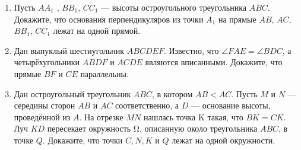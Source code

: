 \documentclass{article}
\begin{document}
\begin{enumerate}[label*=\protect\fbox{\arabic{enumi}}]
\item Пусть $AA_1$ , $BB_1$, $CC_1$ — высоты остроугольного треугольника $ABC$. Докажите, что основания перпендикуляров из точки $A_1$ на прямые $AB$, $AC$, $BB_1$, $CC_1$ лежат на одной прямой.

\item Дан выпуклый шестиугольник $ABCDEF$. Известно, что $\angle FAE = \angle BDC$, а четырёхугольники $ABDF$ и $ACDE$ являются вписанными. Докажите, что прямые $BF$ и $CE$ параллельны.

\item Дан остроугольный треугольник $ABC$, в котором $AB < AC$. Пусть $M$ и $N$ — середины сторон $AB$ и $AC$ соответственно, а $D$ — основание высоты, проведённой из $A$. На
отрезке $MN$ нашлась точка K такая, что $BK = CK$. Луч $KD$ пересекает окружность Ω, описанную около треугольника $ABC$, в точке $Q$. Докажите, что точки $C, N, K$ и $Q$
лежат на одной окружности.



\end{enumerate}
\end{document}
